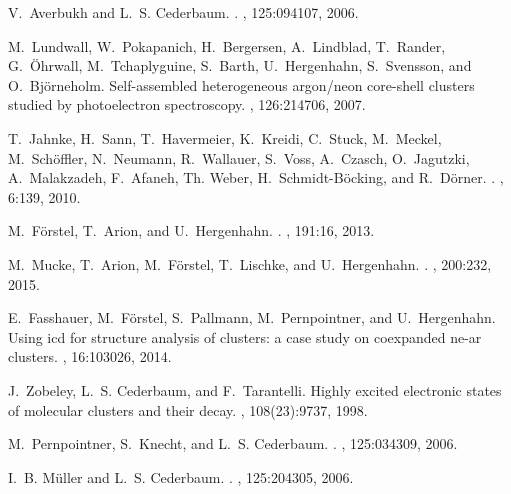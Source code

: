 \documentclass[12pt,twocolumn]{iopart}
\begin{document}
\begin{thebibliography}{10}
V.~Averbukh and L.~S. Cederbaum.
.
, 125:094107, 2006.

M.~Lundwall, W.~Pokapanich, H.~Bergersen, A.~Lindblad, T.~Rander, G.~\"Ohrwall,
  M.~Tchaplyguine, S.~Barth, U.~Hergenhahn, S.~Svensson, and O.~Bj\"orneholm.
\newblock Self-assembled heterogeneous argon/neon core-shell clusters studied
  by photoelectron spectroscopy.
, 126:214706, 2007.

T.~Jahnke, H.~Sann, T.~Havermeier, K.~Kreidi, C.~Stuck, M.~Meckel,
  M.~Sch{\"o}ffler, N.~Neumann, R.~Wallauer, S.~Voss, A.~Czasch, O.~Jagutzki,
  A.~Malakzadeh, F.~Afaneh, Th. Weber, H.~Schmidt-B{\"o}cking, and
  R.~D{\"o}rner.
.
, 6:139, 2010.

M.~F{\"o}rstel, T.~Arion, and U.~Hergenhahn.
.
, 191:16, 2013.

M.~Mucke, T.~Arion, M.~F{\"o}rstel, T.~Lischke, and U.~Hergenhahn.
.
, 200:232, 2015.

E.~Fasshauer, M.~F\"orstel, S.~Pallmann, M.~Pernpointner, and U.~Hergenhahn.
\newblock Using icd for structure analysis of clusters: a case study on
  coexpanded ne-ar clusters.
, 16:103026, 2014.

J.~Zobeley, L.~S. Cederbaum, and F.~Tarantelli.
\newblock Highly excited electronic states of molecular clusters and their
  decay.
, 108(23):9737, 1998.

M.~Pernpointner, S.~Knecht, and L.~S. Cederbaum.
.
, 125:034309, 2006.

I.~B. M{\"u}ller and L.~S. Cederbaum.
.
, 125:204305, 2006.


\end{thebibliography}
\end{document}
